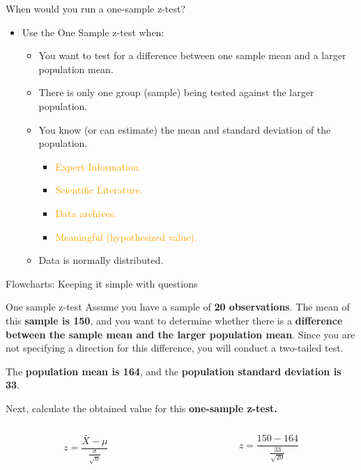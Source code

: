 \documentclass[
  ignorenonframetext,
]{beamer}
\providecommand{\tightlist}{%
  \setlength{\itemsep}{0pt}\setlength{\parskip}{0pt}}
\begin{document}
\begin{frame}{When would you run a one-sample z-test?}
\label{when-would-you-run-a-one-sample-z-test-1}
\begin{itemize}
\tightlist
\item
  Use the One Sample z-test when:

  \begin{itemize}
  \tightlist
  \item
    You want to test for a difference between one sample mean and a
    larger population mean.
  \item
    There is only one group (sample) being tested against the larger
    population.
  \item
    You know (or can estimate) the mean and standard deviation of the
    population.

    \begin{itemize}
    \tightlist
    \item
      \textcolor{orange}{Expert Information.}
    \item
      \textcolor{orange}{Scientific Literature.}
    \item
      \textcolor{orange}{Data archives.}
    \item
      \textcolor{orange}{Meaningful (hypothesized value).}
    \end{itemize}
  \item
    Data is normally distributed.
  \end{itemize}
\end{itemize}
\end{frame}

\begin{frame}{Flowcharts: Keeping it simple with questions}
\label{flowcharts-keeping-it-simple-with-questions}
\end{frame}

\begin{frame}{One sample z-test}
\label{one-sample-z-test}
Assume you have a sample of \textbf{20 observations}. The mean of this
\textbf{sample is 150}, and you want to determine whether there is a
\textbf{difference between the sample mean and the larger population
mean}. Since you are not specifying a direction for this difference, you
will conduct a two-tailed test.

The \textbf{population mean is 164}, and the \textbf{population standard
deviation is 33}.

Next, calculate the obtained value for this \textbf{one-sample z-test.}

\begin{columns}[T]
\begin{column}{0.5\textwidth}
\[
z = \frac{\bar{X} - \mu}{\frac{\sigma}{\sqrt{n}}}
\]
\end{column}

\begin{column}{0.5\textwidth}
\[
z = \frac{150 - 164}{\frac{33}{\sqrt{20}}}
\]
\end{column}
\end{columns}
\end{frame}
\end{document}
